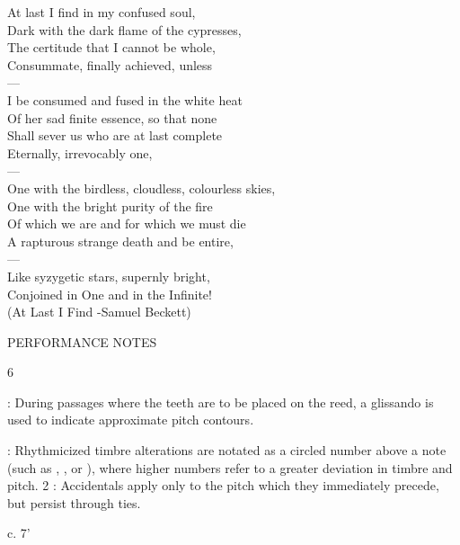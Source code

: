 \documentclass[11pt]{article}
\newcommand*\circled[1]{\tikz[baseline=(char.base)]{
            \node[shape=circle,draw,inner sep=1pt] (char) {#1};}}
\begin{document}
\begingroup
\begin{center}
At last I find in my confused soul, \\
Dark with the dark flame of the cypresses, \\
The certitude that I cannot be whole, \\
Consummate, finally achieved, unless \\
 ---\\
I be consumed and fused in the white heat \\
Of her sad finite essence, so that none \\
Shall sever us who are at last complete \\
Eternally, irrevocably one, \\
 ---\\
One with the birdless, cloudless, colourless skies, \\
One with the bright purity of the fire \\
Of which we are and for which we must die \\
A rapturous strange death and be entire, \\
 ---\\
Like syzygetic stars, supernly bright, \\
Conjoined in One and in the Infinite! \\
\rightskip\leftskip
\phantom{text} \hfill (At Last I Find -Samuel Beckett)
\end{center}
\endgroup

\vspace*{2\baselineskip}

\begin{center}
\huge PERFORMANCE NOTES
\end{center}6
\begingroup
\begin{center}

 : During passages where the teeth are to be placed on the reed, a glissando is used to indicate approximate pitch contours.
\rightskip\leftskip
\phantom{text} \hfill \phantom{()}


 : Rhythmicized timbre alterations are notated as a circled number above a note (such as \circled{1}, \circled{2}, or \circled{3}), where higher numbers refer to a greater deviation in timbre and pitch.
\rightskip\leftskip
\phantom{text} \hfill \phantom{()}2
 : Accidentals apply only to the pitch which they immediately precede, but persist through ties.
\rightskip\leftskip
\phantom{text} \hfill \phantom{()}
\end{center}
\endgroup

\vspace*{35.5\baselineskip}

\begin{center}
c. 7'
\end{center}
\end{document}
